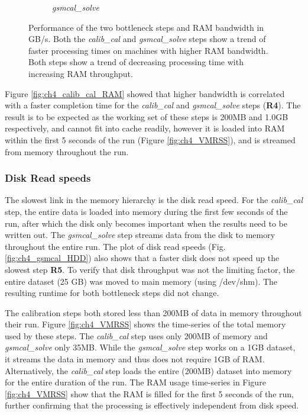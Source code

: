 \begin{figure}
\begin{subfigure}[b]{0.45\linewidth}
      \caption{\textit{gsmcal\_solve}}
	\label{fig:ch4_gamcal_RAM}
 \end{subfigure}
 \label{fig:ch4_ram_bandw}
    \caption[Effect of RAM throughput on the bottle neck steps for the four test machines.]{Performance of the two bottleneck steps and RAM bandwidth in GB/s. Both the \textit{calib\_cal} and \textit{gsmcal\_solve} steps show a trend of faster processing times on machines with higher RAM bandwidth. Both steps show a trend of decreasing processing time with increasing RAM throughput.} 
\end{figure}

Figure \ref{fig:ch4_calib_cal_RAM} showed that higher bandwidth is correlated with a faster completion time for the \textit{calib\_cal} and \textit{gsmcal\_solve} steps (\textbf{R4}). The result is to be expected as the working set of these steps is 200MB and 1.0GB respectively, and cannot fit into cache readily, however it is loaded into RAM within the first 5 seconds of the run (Figure \ref{fig:ch4_VMRSS}), and is streamed from memory throughout the run. 

\subsubsection{Disk Read speeds}

The slowest link in the memory hierarchy is the disk read speed. For the \textit{calib\_cal} step, the entire data is loaded into memory during the first few seconds of the run, after which the disk only becomes important when the results need to be written out. The \textit{gsmcal\_solve} step streams data from the disk to memory throughout the entire run.  The plot of disk read speeds (Fig. \ref{fig:ch4_gsmcal_HDD}) also shows that a faster disk does not speed up the slowest step \textbf{R5}. To verify that disk throughput was not the limiting factor, the entire dataset (25 GB) was moved to main memory (using /dev/shm).  The resulting runtime for both bottleneck steps did not change.  

The calibration steps both stored less than 200MB of data in memory throughout their run. Figure \ref{fig:ch4_VMRSS} shows the time-series of the total memory used by these steps. The \textit{calib\_cal} step uses only 200MB of memory and \textit{gsmcal\_solve} only 35MB. While the \textit{gsmcal\_solve} step works on a 1GB dataset, it streams the data in memory and thus does not require 1GB of RAM. Alternatively, the \textit{calib\_cal} step loads the entire (200MB) dataset into memory for the entire duration of the run. The RAM usage time-series in Figure \ref{fig:ch4_VMRSS} show that the RAM is filled for the first 5 seconds of the run, further confirming that the processing is effectively independent from disk speed. 


